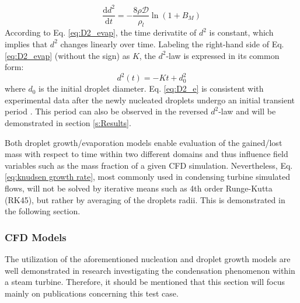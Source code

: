 \documentclass[12pt]{article}
\numberwithin{equation}{section}
\begin{document}
\begin{equation}\label{eq:D2_evap}
    \frac{\mathrm{d}d^{2}}{\mathrm{d}t}=-\frac{8\rho\mathcal{D}}{\rho_{l}}\ln(1+B_{M})
\end{equation}
According to Eq. \ref{eq:D2_evap}, the time derivatite of $d^{2}$ is constant, which implies that $d^{2}$ changes linearly over time. Labeling the right-hand side of Eq. \ref{eq:D2_evap} (without the sign) as $K$, the $d^{2}$-law is expressed in its common form:
\begin{equation}\label{eq:D2_e}
    d^{2}(t)=-Kt+d_{0}^{2}
\end{equation}
where $d_{0}$ is the initial droplet diameter. Eq. \ref{eq:D2_e} is consistent with experimental data after the newly nucleated droplets undergo an initial transient period \cite{turns2011introduction}. This period can also be observed in the reversed $d^{2}$-law and will be demonstrated in section \ref{s:Results}.

Both droplet growth/evaporation models enable evaluation of the gained/lost mass with respect to time within two different domains and thus influence field variables such as the mass fraction of a given CFD simulation. Nevertheless, Eq. \ref{eq:knudsen growth rate}, most commonly used in condensing turbine simulated flows, will not be solved by iterative means such as 4th order Runge-Kutta (RK45), but rather by averaging of the droplets radii. This is demonstrated in the following section.   
\subsubsection{CFD Models}\label{sss:Literature-Homogeneous-CFD}
The utilization of the aforementioned nucleation and droplet growth models are well demonstrated in research investigating the condensation phenomenon within a steam turbine. Therefore, it should be mentioned that this section will focus mainly on publications concerning this test case. 
\end{document}
